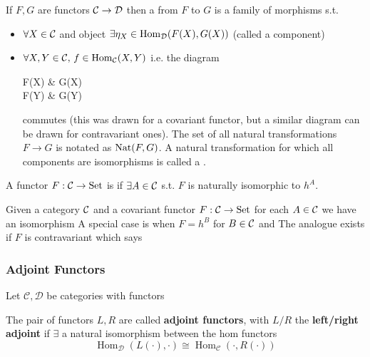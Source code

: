\documentclass{article}
\begin{document}
\begin{definition}
	If $F,G$ are functors $\mathcal{C} \to \mathcal{D}$ then a  from $F$ to $G$ is a family of morphisms s.t. 
	\begin{itemize}
		\item $\forall X \in \mathcal{C}$ and object $\exists \eta_X \in \operatorname{Hom}_{\mathcal{D}}(F(X),G(X))$ (called a component)
		\item $\forall X,Y \in \mathcal{C}, \, f \in \operatorname{Hom}_{\mathcal{C}}(X,Y)$
		i.e. the diagram 
		\begin{tkz}
			F(X) \arrow[r,"\eta_X"] \arrow[d,"F(Y)"'] & G(X) \arrow[d,"G(f)"] \\
			F(Y) \arrow[r,"\eta_Y"'] & G(Y)
		\end{tkz}
		commutes (this was drawn for a covariant functor, but a similar diagram can be drawn for contravariant ones). The set of all natural transformations $F \to G$ is notated as $\operatorname{Nat}(F,G)$. A natural transformation for which all components are isomorphisms is called a .
	\end{itemize}
\end{definition}

\begin{definition}
	A functor $F:\mathcal{C} \to \text{Set}$ is  if $\exists A \in \mathcal{C}$ s.t. $F$ is naturally isomorphic to $h^A$.
\end{definition}

\begin{lemma}
	Given a category $\mathcal{C}$ and a covariant functor $F:\mathcal{C} \to \text{Set}$ for each $A \in \mathcal{C}$ we have an isomorphism 
	A special case is when $F = h^B$ for $B \in \mathcal{C}$ and 
	The analogue exists if $F$ is contravariant which says 
\end{lemma}

\subsubsection{Adjoint Functors}

\begin{definition}
	Let $\mathcal{C}, \mathcal{D}$ be categories with functors 
	\begin{center}
\end{center}
The pair of functors $L,R$ are called \textbf{adjoint functors}, with $L/R$ the \textbf{left/right adjoint} if $\exists$ a natural isomorphism between the hom functors 
\[
\operatorname{Hom}_{\mathcal{D}}(L(\cdot),\cdot) \cong \operatorname{Hom}_{\mathcal{C}}(\cdot, R(\cdot))
\]
\end{definition}
\end{document}
